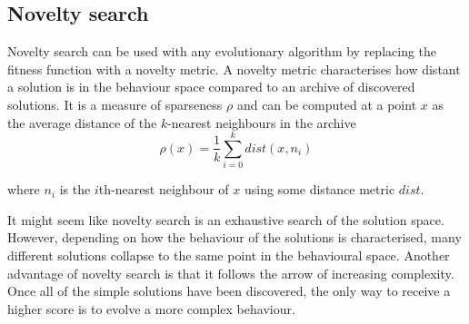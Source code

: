\subsection{Novelty search}
Novelty search can be used with any evolutionary algorithm by replacing the fitness
function with a novelty metric. A novelty metric characterises how distant a solution
is in the behaviour space compared to an archive of discovered solutions. It is a measure
of sparseness $\rho$ and can be computed at a point $x$ as the average distance of the
$k$-nearest neighbours in the archive
\[
    \rho(x) = \frac{1}{k} \sum_{i=0}^{k} dist(x, n_{i})
\]

where $n_{i}$ is the $i$th-nearest neighbour of $x$ using some distance metric $dist$.

It might seem like novelty search is an exhaustive search of the solution space. However,
depending on how the behaviour of the solutions is characterised, many different solutions
collapse to the same point in the behavioural space. Another advantage of novelty search
is that it follows the arrow of increasing complexity. Once all of the simple solutions
have been discovered, the only way to receive a higher score is to evolve a more complex
behaviour.